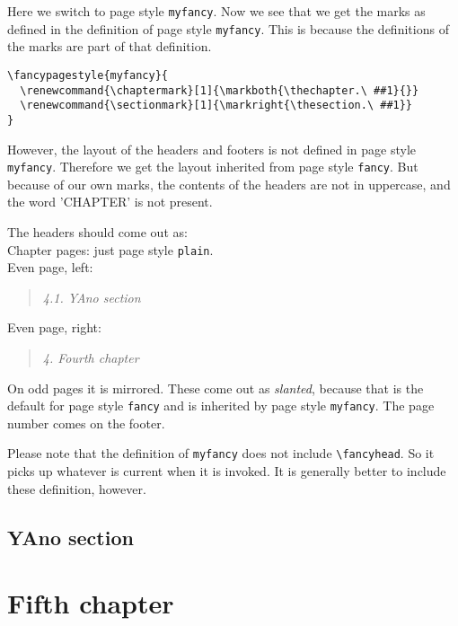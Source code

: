 \documentclass[openany]{book}
\renewcommand{\chaptermark}[1]{\markboth{\thechapter.\ #1}{}}
\renewcommand{\sectionmark}[1]{\markright{\thesection.\ #1}}
\renewcommand{\chaptermark}[1]{\markboth{\thechapter.\ ##1}{}}
\renewcommand{\sectionmark}[1]{\markright{\thesection.\ ##1}}
\renewcommand{\chaptermark}[1]{\markboth{\thechapter.\ ##1}{}}
\renewcommand{\sectionmark}[1]{\markright{\thesection.\ ##1}}
\begin{document}
\noindent
\begin{boxedminipage}{\textwidth}
Here we switch to page style \texttt{myfancy}.
Now we see that we get the marks as defined in the definition of page style \texttt{myfancy}.
This is because the definitions of the marks are  part of that definition.
\begin{verbatim}
\fancypagestyle{myfancy}{
  \renewcommand{\chaptermark}[1]{\markboth{\thechapter.\ ##1}{}}
  \renewcommand{\sectionmark}[1]{\markright{\thesection.\ ##1}}
}
\end{verbatim}

However, the layout of the headers and footers is not defined in page style \texttt{myfancy}. Therefore we get the layout inherited from page style \texttt{fancy}.
But because of our own marks, the contents of the headers are not in uppercase, and the word 'CHAPTER' is not present.

The headers should come out as:
\\
Chapter pages: just page style \texttt{plain}.
\\
Even page, left:
\begin{quote}
  \textsl{4.1. YAno section}
\end{quote}
Even page, right:
\begin{quote}
  \textsl{4. Fourth chapter}
\end{quote}
On odd pages it is mirrored.
These come out as \textsl{slanted}, because that is the default for page style \texttt{fancy} and is inherited by page style \texttt{myfancy}.
The page number comes on the footer.

Please note that the definition of \texttt{myfancy} does not include \verb|\fancyhead|. So it picks up whatever is current when it is invoked. It is generally better to include these definition, however.
\end{boxedminipage}
\bigskip

\lipsum[1]

\section{YAno section}

\lipsum

\newpage
\pagestyle{myotherfancy}
\chapter{Fifth chapter}
\end{document}

